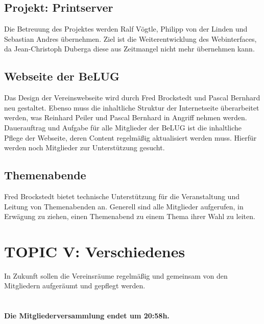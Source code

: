 \documentclass[11pt,a4paper,ngerman]{article}
\begin{document}
  \subsection{Projekt: Printserver}

Die Betreuung des Projektes werden Ralf Vögtle, Philipp von der Linden und 
Sebastian Andres übernehmen. Ziel ist die Weiterentwicklung des Webinterfaces, 
da Jean-Christoph Duberga diese aus Zeitmangel nicht mehr übernehmen kann.  
  
  
  
  \subsection{Webseite der BeLUG}
  
Das Design der Vereinswebseite wird durch Fred Brockstedt und Pascal Bernhard 
neu gestaltet. Ebenso muss die inhaltliche Struktur der Internetseite 
überarbeitet werden, was Reinhard Peiler und Pascal Bernhard in Angriff nehmen 
werden. Dauerauftrag und Aufgabe für alle Mitglieder der BeLUG ist die 
inhaltliche Pflege der Webseite, deren Content regelmäßig aktualisiert werden 
muss. Hierfür werden noch Mitglieder zur Unterstützung gesucht. 
  
  

  \subsection{Themenabende}

Fred Brockstedt bietet technische Unterstützung für die Veranstaltung und 
Leitung von Themenabenden an. Generell sind alle Mitglieder aufgerufen, in 
Erwägung zu ziehen, einen Themenabend zu einem Thema ihrer Wahl zu leiten.



\section{TOPIC V: Verschiedenes}


In Zukunft sollen die Vereinsräume regelmäßig und gemeinsam von den 
Mitgliedern aufgeräumt und gepflegt werden.\\
\\
\\
\textbf{Die Mitgliederversammlung endet um 20:58h.}
\end{document}
